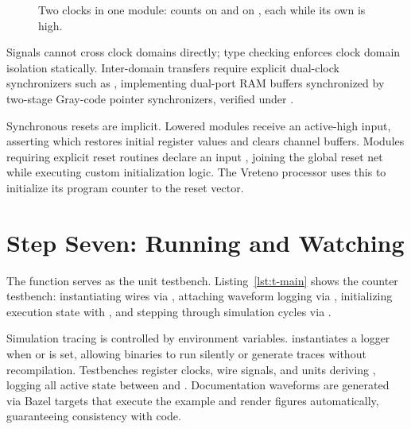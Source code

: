 \documentclass[journal,9pt]{IEEEtran}
\begin{document}


\begin{figure}[htbp]
\centering

\caption{Two clocks in one module:  counts on  and
 on , each while its own  is high.}
\label{fig:t-twoclock}
\end{figure}

Signals cannot cross clock domains directly; type checking enforces clock domain
isolation statically. Inter-domain transfers require explicit dual-clock
synchronizers such as , implementing dual-port RAM buffers
synchronized by two-stage Gray-code pointer synchronizers, verified under
.

Synchronous resets are implicit. Lowered modules receive an active-high
 input, asserting which restores initial register values and clears
channel buffers. Modules requiring explicit reset routines declare an input
, joining the global reset net while executing custom
initialization logic. The Vreteno processor uses this to initialize its program
counter to the reset vector.

\section{Step Seven: Running and Watching}
\label{sec:t-testbench}

The  function serves as the unit testbench. Listing~\ref{lst:t-main}
shows the counter testbench: instantiating wires via , attaching
waveform logging via , initializing execution state
with , and stepping through simulation cycles via
.



Simulation tracing is controlled by environment variables.
 instantiates a logger when  or
 is set, allowing binaries to run silently or generate traces
without recompilation. Testbenches register clocks, wire signals, and units
deriving , logging all active state between  and
. Documentation waveforms are generated via Bazel 
targets that execute the example and render figures automatically, guaranteeing
consistency with code.
\end{document}
